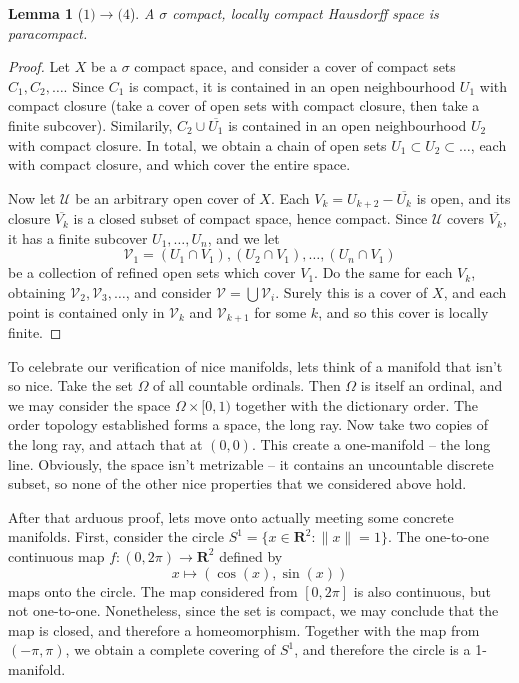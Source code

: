 \documentclass[12pt]{report}
\theoremstyle{plain}
\newtheorem{lemma}[theorem]{Lemma}
\theoremstyle{definition}
\begin{document}
\begin{lemma}[$1) \to (4$]
    A $\sigma$ compact, locally compact Hausdorff space is paracompact.
\end{lemma}
\begin{proof}
    Let $X$ be a $\sigma$ compact space, and consider a cover of compact sets $C_1, C_2, \dots$. Since $C_1$ is compact, it is contained in an open neighbourhood $U_1$ with compact closure (take a cover of open sets with compact closure, then take a finite subcover). Similarily, $C_2 \cup \overline{U_1}$ is contained in an open neighbourhood $U_2$ with compact closure. In total, we obtain a chain of open sets $U_1 \subset U_2 \subset \dots$, each with compact closure, and which cover the entire space.

    Now let $\mathcal{U}$ be an arbitrary open cover of $X$. Each $V_k = U_{k+2} - \overline{U_k}$ is open, and its closure $\overline{V_k}$ is a closed subset of compact space, hence compact. Since $\mathcal{U}$ covers $\overline{V_k}$, it has a finite subcover $U_1, \dots, U_n$, and we let
    \[ \mathcal{V}_1 = (U_1 \cap V_1), (U_2 \cap V_1), \dots, (U_n \cap V_1) \]
    be a collection of refined open sets which cover $V_1$. Do the same for each $V_k$, obtaining $\mathcal{V}_2, \mathcal{V}_3, \dots$, and consider $\mathcal{V} = \bigcup \mathcal{V}_i$. Surely this is a cover of $X$, and each point is contained only in $\mathcal{V}_k$ and $\mathcal{V}_{k+1}$ for some $k$, and so this cover is locally finite.
\end{proof}

To celebrate our verification of nice manifolds, lets think of a manifold that isn't so nice. Take the set $\Omega$ of all countable ordinals. Then $\Omega$ is itself an ordinal, and we may consider the space $\Omega \times [0,1)$ together with the dictionary order. The order topology established forms a space, the long ray. Now take two copies of the long ray, and attach that at $(0,0)$. This create a one-manifold -- the long line. Obviously, the space isn't metrizable -- it contains an uncountable discrete subset, so none of the other nice properties that we considered above hold.


After that arduous proof, lets move onto actually meeting some concrete manifolds. First, consider the circle $S^1 = \{ x \in \mathbf{R}^2 : \|x\| = 1 \}$. The one-to-one continuous map $f: (0, 2\pi) \to \mathbf{R}^2$ defined by
%
\[ x \mapsto (\cos (x), \sin (x)) \]
%
maps onto the circle. The map considered from $[0, 2\pi]$ is also continuous, but not one-to-one. Nonetheless, since the set is compact, we may conclude that the map is closed, and therefore a homeomorphism. Together with the map from $(-\pi, \pi)$, we obtain a complete covering of $S^1$, and therefore the circle is a 1-manifold.
\end{document}
